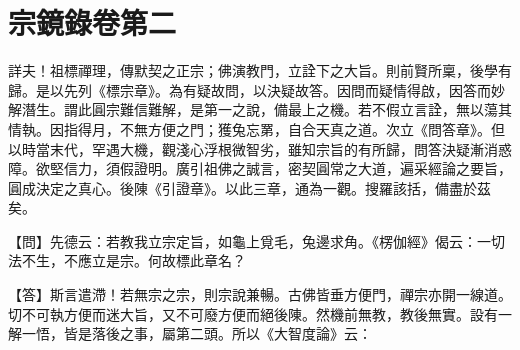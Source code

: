 
% 

\chapter{宗鏡錄卷第二}

詳夫！祖標禪理，傳默契之正宗；佛演教門，立詮下之大旨。則前賢所稟，後學有歸。是以先列《標宗章》。為有疑故問，以決疑故答。因問而疑情得啟，因答而妙解潛生。謂此圓宗難信難解，是第一之說，備最上之機。若不假立言詮，無以蕩其情執。因指得月，不無方便之門；獲兔忘罤，自合天真之道。次立《問答章》。但以時當末代，罕遇大機，觀淺心浮根微智劣，雖知宗旨的有所歸，問答決疑漸消惑障。欲堅信力，須假證明。廣引祖佛之誠言，密契圓常之大道，遍采經論之要旨，圓成決定之真心。後陳《引證章》。以此三章，通為一觀。搜羅該括，備盡於茲矣。 


{\heiti 【問】先德云：若教我立宗定旨，如龜上覓毛，兔邊求角。《楞伽經》偈云：一切法不生，不應立是宗。何故標此章名？}

【答】斯言遣滯！若無宗之宗，則宗說兼暢。古佛皆垂方便門，禪宗亦開一線道。切不可執方便而迷大旨，又不可廢方便而絕後陳。然機前無教，教後無實。設有一解一悟，皆是落後之事，屬第二頭。所以《大智度論》云：

